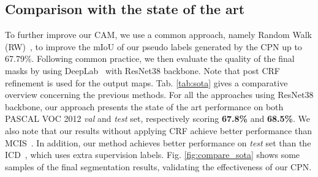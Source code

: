 \documentclass[10pt,twocolumn,letterpaper]{article}
\begin{document}
\subsection{Comparison with the state of the art}
To further improve our CAM, we use a common approach, namely Random Walk (RW)~\cite{affinity}, to improve the mIoU of our pseudo labels generated by the CPN up to 67.79\%. Following common practice, we then evaluate the quality of the final masks by using  DeepLab~\cite{v1} with ResNet38 backbone. Note that post CRF refinement is used for the output maps. Tab. \ref{tab:sota} gives a comparative overview concerning the previous methods. For all the approaches using ResNet38 backbone, our approach presents the state of the art performance on both PASCAL VOC 2012 \textit{val} and \textit{test} set, respectively scoring \textbf{67.8\%} and \textbf{68.5\%}. We also note that our results without applying CRF achieve better performance than MCIS~\cite{coatten}. In addition, our method achieves better performance on \textit{test} set than the ICD~\cite{ICD}, which uses extra supervision labels. Fig. \ref{fig:compare_sota} shows some samples of the final segmentation results, validating the effectiveness of our CPN.
\end{document}
